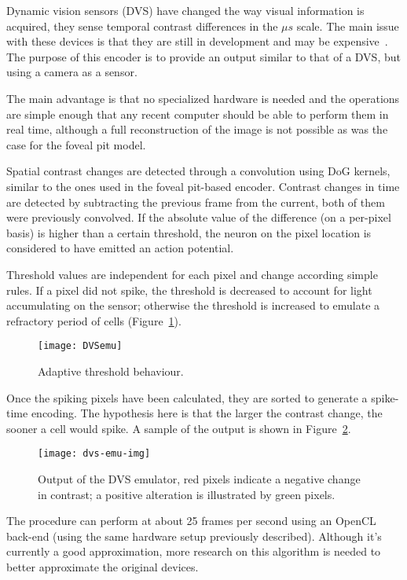 Dynamic vision sensors (DVS) have changed the way visual information is acquired, they sense temporal contrast differences in the $\mu s$ scale. The main issue with these devices is that they are still in development and may be expensive~\cite{aer-retina-bernabe,dvs-zurich}. The purpose of this encoder is to provide an output similar to that of a DVS, but using a camera as a sensor.

The main advantage is that no specialized hardware is needed and the operations are simple enough that any recent computer should be able to perform them in real time, although a full reconstruction of the image is not possible as was the case for the foveal pit model.

Spatial contrast changes are detected through a convolution using DoG kernels, similar to the ones used in the foveal pit-based encoder. Contrast changes in time are detected by subtracting the previous frame from the current, both of them were previously convolved. If the absolute value of the difference (on a per-pixel basis) is higher than a certain threshold, the neuron on the pixel location is considered to have emitted an action potential. 

Threshold values are independent for each pixel and change according simple rules. If a pixel did not spike, the threshold is decreased to account for light accumulating on the sensor; otherwise the threshold is increased to emulate a refractory period of cells (Figure~\ref{fig:c2s:threshold_behaviour}).

\begin{figure}[h]
  \begin{center}
    \texttt{[image: DVSemu]}
    \caption{Adaptive threshold behaviour.}
    \label{fig:c2s:threshold_behaviour}
  \end{center}
\end{figure}
\newpage
Once the spiking pixels have been calculated, they are sorted to generate a spike-time encoding. The hypothesis here is that the larger the contrast change, the sooner a cell would spike. A sample of the output is shown in Figure~\ref{fig:c2s:dvs-emu-output}.

\begin{figure}[h]
  \begin{center}
    \texttt{[image: dvs-emu-img]}
    \caption{Output of the DVS emulator, red pixels indicate a negative change in contrast; a positive alteration is illustrated by green pixels.}
    \label{fig:c2s:dvs-emu-output}
  \end{center}
\end{figure}

The procedure can perform at about 25 frames per second using an OpenCL back-end (using the same hardware setup previously described). Although 
it's currently a good approximation, more research on this algorithm is needed 
to better approximate the original devices.

